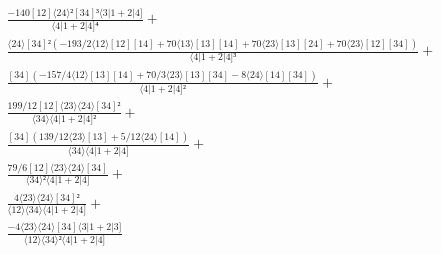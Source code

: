 \documentclass[varwidth, border=5pt]{standalone}
\begin{document}
\begin{my}
$\begin{gathered}
\scriptscriptstyle\frac{-140[12]⟨24⟩²[34]³⟨3|1+2|4]}{⟨4|1+2|4]⁴} +\\
\scriptscriptstyle\frac{⟨24⟩[34]²(-193/2⟨12⟩[12][14]+70⟨13⟩[13][14]+70⟨23⟩[13][24]+70⟨23⟩[12][34])}{⟨4|1+2|4]³} +\\
\scriptscriptstyle\frac{[34](-157/4⟨12⟩[13][14]+70/3⟨23⟩[13][34]-8⟨24⟩[14][34])}{⟨4|1+2|4]²} +\\
\scriptscriptstyle\frac{199/12[12]⟨23⟩⟨24⟩[34]²}{⟨34⟩⟨4|1+2|4]²} +\\
\scriptscriptstyle\frac{[34](139/12⟨23⟩[13]+5/12⟨24⟩[14])}{⟨34⟩⟨4|1+2|4]} +\\
\scriptscriptstyle\frac{79/6[12]⟨23⟩⟨24⟩[34]}{⟨34⟩²⟨4|1+2|4]} +\\
\scriptscriptstyle\frac{4⟨23⟩⟨24⟩[34]²}{⟨12⟩⟨34⟩⟨4|1+2|4]} +\\
\scriptscriptstyle\frac{-4⟨23⟩⟨24⟩[34]⟨3|1+2|3]}{⟨12⟩⟨34⟩²⟨4|1+2|4]} \phantom{+}
\end{gathered}$
\end{my}
\end{document}
